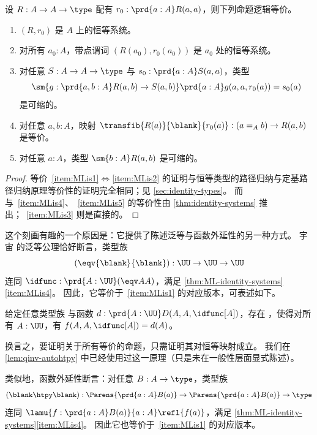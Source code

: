 \begin{thm}\label{thm:ML-identity-systems}
  设 $R:A\to A\to\type$ 配有 $r_0:\prd{a:A} R(a,a)$，则下列命题逻辑等价。
  \begin{enumerate}
  \item $(R,r_0)$ 是 $A$ 上的恒等系统。\label{item:MLis1}
  \item 对所有 $a_0:A$，带点谓词 $(R(a_0),r_0(a_0))$ 是 $a_0$ 处的恒等系统。\label{item:MLis2}
  \item 对任意 $S:A\to A\to\type$ 与 $s_0:\prd{a:A} S(a,a)$，类型
    \[ \sm{g:\prd{a,b:A} R(a,b) \to S(a,b)} \prd{a:A} g(a,a,r_0(a)) = s_0(a) \]
    是可缩的。\label{item:MLis3}
  \item 对任意 $a,b:A$，映射 $\transfib{R(a)}{\blank}{r_0(a)} : (a =_A b) \to R(a,b)$ 是等价。\label{item:MLis4}
  \item 对任意 $a:A$，类型 $\sm{b:A} R(a,b)$ 是可缩的。\label{item:MLis5}
  \end{enumerate}
\end{thm}
\begin{proof}
  等价~\ref{item:MLis1}$\Leftrightarrow$\ref{item:MLis2} 的证明与恒等类型的路径归纳与定基路径归纳原理等价性的证明完全相同；见 \cref{sec:identity-types}。
  而与~\ref{item:MLis4}、~\ref{item:MLis5} 的等价性由 \cref{thm:identity-systems} 推出；~\ref{item:MLis3} 则是直接的。
\end{proof}

%

这个刻画有趣的一个原因是：它提供了陈述泛等与函数外延性的另一种方式。
%
宇宙 \UU 的泛等公理恰好断言，类型族
\[ (\eqv{\blank}{\blank}) : \UU\to\UU\to\UU \]
连同 $\idfunc : \prd{A:\UU} (\eqv AA)$，满足 \cref{thm:ML-identity-systems}\ref{item:MLis4}。
因此，它等价于~\ref{item:MLis1} 的对应版本，可表述如下。

\begin{cor}[等价归纳]\label{thm:equiv-induction}
  给定任意类型族  与函数 $d:\prd{A:\UU} D(A,A,\idfunc[A])$，存在 ，使得对所有 $A:\UU$，有 $f(A,A,\idfunc[A]) = d(A)$。
\end{cor}

换言之，要证明关于所有等价的命题，只需证明其对恒等映射成立。
我们在 \cref{lem:qinv-autohtpy} 中已经使用过这一原理（只是未在一般性层面显式陈述）。

类似地，函数外延性断言：对任意 $B:A\to\type$，类型族
\[ (\blank\htpy\blank) : \Parens{\prd{a:A} B(a)} \to \Parens{\prd{a:A} B(a)} \to \type
\]
连同 $\lamu{f:\prd{a:A} B(a)}{a:A} \refl{f(a)}$，满足 \cref{thm:ML-identity-systems}\ref{item:MLis4}。
因此它也等价于~\ref{item:MLis1} 的对应版本。

